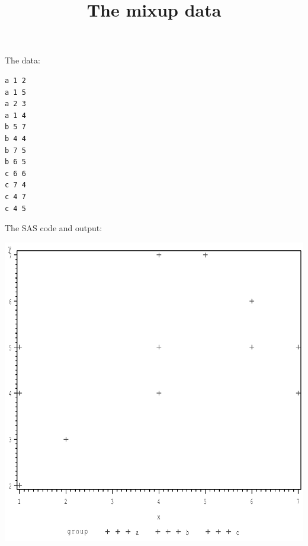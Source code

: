 \documentclass{article}
\title{The mixup data}
\begin{document}
\maketitle
The data:
\begin{verbatim}
a 1 2
a 1 5
a 2 3
a 1 4
b 5 7
b 4 4
b 7 5
b 6 5
c 6 6
c 7 4
c 4 7
c 4 5
\end{verbatim}
The SAS code and output:
\includegraphics[]{mixup-1-SAS-fig.pdf}
    
\end{document}
